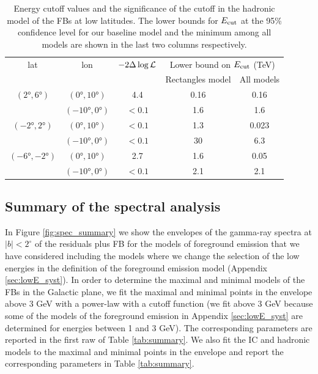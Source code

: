 \begin{table}
  \begin{center}
    \caption{\label{tab:pi0} 
Energy cutoff values and the significance of the cutoff in the hadronic model of the FBs at low latitudes.
The lower bounds for $E_{\text{cut}}$ at the 95\% confidence level for our baseline model and the minimum among all
models are shown in the last two columns respectively. 
}
    \begin{tabular}{|c|c|c|c|c|} %
     	\hline
		 lat & lon  & $-2 \Delta \log {\mathcal{L}}$ & \multicolumn{2}{c|}{Lower bound on $E_{\text{cut}}$ (TeV) } \\
		      &        &                                  &       \multicolumn{1}{c}{Rectangles model} & All models \\ 
		\hline
  		$(\ang{2}, \ang{6})$ & $(\ang{0}, \ang{10})$ & 4.4 & 0.16  & 0.16 \\ 
		& $(\ang{-10}, \ang{0})$ &  $ < 0.1$ & 1.6 & 1.6 \\ 
 		\hline
  		$(\ang{-2}, \ang{2})$ & $(\ang{0}, \ang{10})$ & $ < 0.1$ & 1.3 & 0.023 \\ 
		& $(\ang{-10}, \ang{0})$ & $ < 0.1$ & 30 & 6.3 \\ 
 		\hline
  		$(\ang{-6}, \ang{-2})$ & $(\ang{0}, \ang{10})$ & 2.7 & 1.6 & 0.05 \\ 
		& $(\ang{-10}, \ang{0})$ & $ < 0.1$ & 2.1 & 2.1 \\ 
 \hline
    \end{tabular}
  \end{center}
\end{table}

\subsection{Summary of the spectral analysis}

In Figure \ref{fig:spec_summary} we show the envelopes of the gamma-ray spectra at $|b| < 2^\circ$ of the residuals plus FB
for the models of foreground emission that we have considered including the models where we change the selection of the low energies 
in the definition of the foreground emission model (Appendix \ref{sec:lowE_syst}).
In order to determine the maximal and minimal models of the FBs in the Galactic plane, 
we fit the maximal and minimal points in the envelope above 3 GeV with a power-law with a cutoff function
(we fit above 3 GeV because some of the models of the foreground emission in Appendix \ref{sec:lowE_syst} are determined 
for energies between 1 and 3 GeV).
The corresponding parameters are reported in the first raw of Table \ref{tab:summary}.
We also fit the IC and hadronic models to the maximal and minimal points in the envelope and report the corresponding parameters
in Table \ref{tab:summary}.


